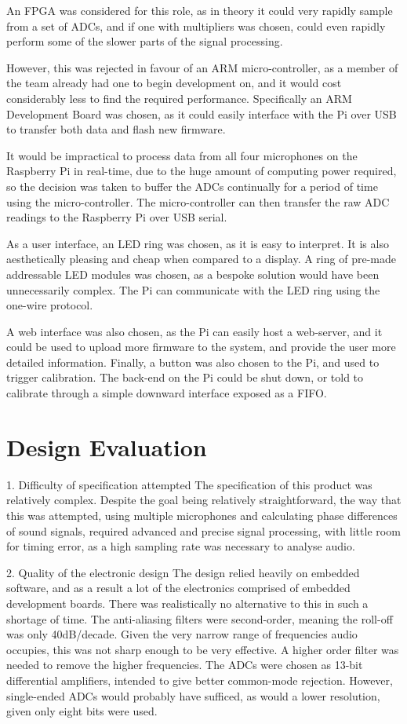 \documentclass[a4paper]{article}
\begin{document}
An FPGA was considered for this role, as in theory it could very rapidly sample
from a set of ADCs, and if one with multipliers was chosen, could even rapidly
perform some of the slower parts of the signal processing.

However, this was rejected in favour of an ARM micro-controller, as a member of
the team already had one to begin development on, and it would cost considerably
less to find the required performance.  Specifically an ARM Development Board
was chosen, as it could easily interface with the Pi over USB to transfer both
data and flash new firmware.

It would be impractical to process data from all four microphones on the
Raspberry Pi in real-time, due to the huge amount of computing power required,
so the decision was taken to buffer the ADCs continually for a period of time
using the micro-controller. The micro-controller can then transfer the raw ADC
readings to the Raspberry Pi over USB serial.

As a user interface, an LED ring was chosen, as it is easy to interpret. It is
also aesthetically pleasing and cheap when compared to a display. A ring of
pre-made addressable LED modules was chosen, as a bespoke solution would have
been unnecessarily complex. The Pi can communicate with the LED ring using the
one-wire protocol.

A web interface was also chosen, as the Pi can easily host a web-server, and it
could be used to upload more firmware to the system, and provide the user more
detailed information.  Finally, a button was also chosen to the Pi, and used to
trigger calibration. The back-end on the Pi could be shut down, or told to
calibrate through a simple downward interface exposed as a FIFO.


\section{Design Evaluation}

1. Difficulty of specification attempted The specification of this product was
relatively complex. Despite the goal being relatively straightforward, the way
that this was attempted, using multiple microphones and calculating phase
differences of sound signals, required advanced and precise signal processing,
with little room for timing error, as a high sampling rate was necessary to
analyse audio.

2. Quality of the electronic design The design relied heavily on embedded
software, and as a result a lot of the electronics comprised of embedded
development boards. There was realistically no alternative to this in such a
shortage of time. The anti-aliasing filters were second-order, meaning the
roll-off was only 40dB/decade. Given the very narrow range of frequencies audio
occupies, this was not sharp enough to be very effective. A higher order filter
was needed to remove the higher frequencies.  The ADCs were chosen as 13-bit
differential amplifiers, intended to give better common-mode rejection. However,
single-ended ADCs would probably have sufficed, as would a lower resolution,
given only eight bits were used.
\end{document}
